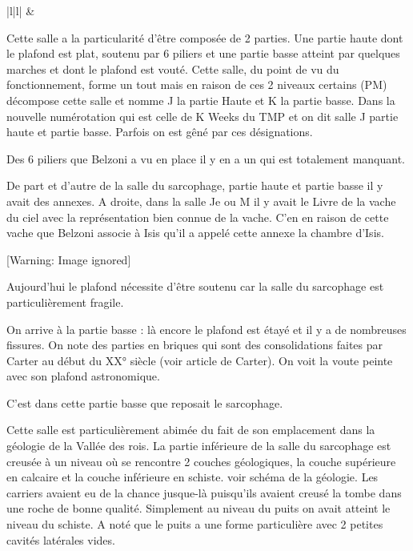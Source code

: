 \documentclass{article}
\begin{document}
\begin{flushleft}
\tablehead{}
\begin{supertabular}{|l|l|}
\hline
{} & \\\hline
\end{supertabular}
\end{flushleft}
Cette salle a la particularité d’être composée de 2 parties. Une partie
haute dont le plafond est plat, soutenu par 6 piliers et une partie
basse atteint par quelques marches et dont le plafond est vouté. Cette
salle, du point de vu du fonctionnement, forme un tout mais en raison
de ces 2 niveaux certains (PM) décompose cette salle et nomme J la
partie Haute et K la partie basse. Dans la nouvelle numérotation qui
est celle de K Weeks  du TMP et on dit salle J partie haute et partie
basse. Parfois on est gêné par ces désignations.

Des 6 piliers que Belzoni a vu en place il y en a un qui est totalement
manquant. 

De part et d’autre de la salle du sarcophage, partie haute et partie
basse il y avait des annexes. A droite, dans la salle Je ou M il y
avait le Livre de la vache du ciel avec la représentation bien connue
de la vache. C’en en raison de cette vache que Belzoni associe à Isis
qu’il a appelé cette annexe la chambre d’Isis.

  [Warning: Image ignored] %
 

Aujourd’hui le plafond nécessite d’être soutenu car la salle du
sarcophage est particulièrement fragile.

On arrive à la partie basse : là encore le plafond est étayé et il y a
de nombreuses fissures. On note des parties en  briques qui sont des
consolidations faites par Carter au début du XX° siècle (voir article
de Carter). On voit la voute peinte avec son plafond astronomique.

C’est dans cette partie basse que reposait le sarcophage.

Cette salle est particulièrement abimée du fait de son emplacement dans
la géologie de la Vallée des rois. La partie inférieure de la salle du
sarcophage est creusée à un niveau où se rencontre 2 couches
géologiques, la couche supérieure en calcaire et la couche inférieure
en schiste. voir schéma de la géologie. Les carriers avaient eu de la
chance jusque-là puisqu’ils avaient creusé la tombe dans une roche de
bonne qualité. Simplement au niveau du puits on avait atteint le niveau
du schiste. A noté que le puits a une forme particulière avec 2 petites
cavités latérales vides. 
\end{document}
